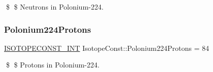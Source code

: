 \$ \$ Neutrons in Polonium-\/224. \mbox{\label{group___isotope_const-_polonium-_po224_ga4e575b030cf2cc451a7c84ddb7c892b8}} 
\subsubsection{\texorpdfstring{Polonium224\+Protons}{Polonium224Protons}}
{\footnotesize\ttfamily \mbox{\hyperlink{group___isotope_const-_macros_ga5f18360b3e99483a35c32d789e62621c}{I\+S\+O\+T\+O\+P\+E\+C\+O\+N\+S\+T\+\_\+\+I\+NT}} Isotope\+Const\+::\+Polonium224\+Protons = 84}

\$ \$ Protons in Polonium-\/224. 